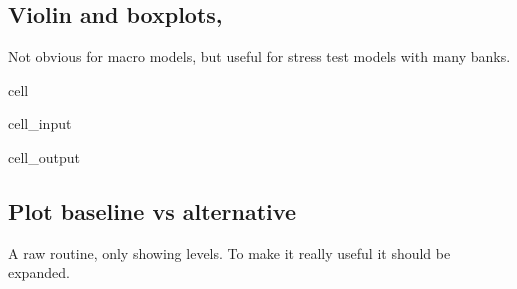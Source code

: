 \documentclass[letterpaper,10pt,english]{jupyterBook}
\begin{document}
\subsection{Violin and boxplots,}
\label{\detokenize{content/notebooks/modelflow_features:violin-and-boxplots}}
\sphinxAtStartPar
Not obvious for macro models, but useful for stress test  models with many banks.

\begin{sphinxuseclass}{cell}\begin{sphinxVerbatimInput}

\begin{sphinxuseclass}{cell_input}
\begin{sphinxVerbatim}[commandchars=\\\{\}]
  
    \PYG{p}{[}\PYG{p}{]}  
    \PYG{p}{[}\PYG{p}{]}  
\end{sphinxVerbatim}

\end{sphinxuseclass}\end{sphinxVerbatimInput}
\begin{sphinxVerbatimOutput}

\begin{sphinxuseclass}{cell_output}
\noindent{}

\noindent{}

\end{sphinxuseclass}\end{sphinxVerbatimOutput}

\end{sphinxuseclass}

\subsection{Plot baseline vs alternative}
\label{\detokenize{content/notebooks/modelflow_features:plot-baseline-vs-alternative}}
\sphinxAtStartPar
A raw routine, only showing levels.
To make it really useful it should be expanded.
\end{document}
